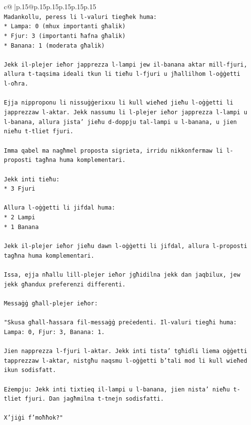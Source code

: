 \documentclass{article}
\begin{document}
{\begin{supertabular}{c@{$\;$}|p{.15\linewidth}@{}p{.15\linewidth}p{.15\linewidth}p{.15\linewidth}p{.15\linewidth}p{.15\linewidth}}
{{{\\ 
\texttt{Madankollu, peress li l{-}valuri tiegħek huma:} \\
\texttt{*   Lampa: 0 (mhux importanti għalik)} \\
\texttt{*   Fjur: 3 (importanti ħafna għalik)} \\
\texttt{*   Banana: 1 (moderata għalik)} \\
\\ 
\texttt{Jekk il{-}plejer ieħor japprezza l{-}lampi jew il{-}banana aktar mill{-}fjuri, allura t{-}taqsima ideali tkun li tieħu l{-}fjuri u jħallilhom l{-}oġġetti l{-}oħra.} \\
\\ 
\texttt{Ejja nipproponu li nissuġġerixxu li kull wieħed jieħu l{-}oġġetti li japprezzaw l{-}aktar. Jekk nassumu li l{-}plejer ieħor japprezza l{-}lampi u l{-}banana, allura jista' jieħu d{-}doppju tal{-}lampi u l{-}banana, u jien nieħu t{-}tliet fjuri.} \\
\\ 
\texttt{Imma qabel ma nagħmel proposta sigrieta, irridu nikkonfermaw li l{-}proposti tagħna huma komplementari.} \\
\\ 
\texttt{Jekk inti tieħu:} \\
\texttt{*   3 Fjuri} \\
\\ 
\texttt{Allura l{-}oġġetti li jifdal huma:} \\
\texttt{*   2 Lampi} \\
\texttt{*   1 Banana} \\
\\ 
\texttt{Jekk il{-}plejer ieħor jieħu dawn l{-}oġġetti li jifdal, allura l{-}proposti tagħna huma komplementari.} \\
\\ 
\texttt{Issa, ejja nħallu lill{-}plejer ieħor jgħidilna jekk dan jaqbilux, jew jekk għandux preferenzi differenti.} \\
\\ 
\texttt{Messaġġ għall{-}plejer ieħor:} \\
\\ 
\texttt{"Skusa għall{-}ħassara fil{-}messaġġ preċedenti. Il{-}valuri tiegħi huma: Lampa: 0, Fjur: 3, Banana: 1.} \\
\\ 
\texttt{Jien napprezza l{-}fjuri l{-}aktar. Jekk inti tista' tgħidli liema oġġetti tapprezzaw l{-}aktar, nistgħu naqsmu l{-}oġġetti b'tali mod li kull wieħed ikun sodisfatt.} \\
\\ 
\texttt{Eżempju: Jekk inti tixtieq il{-}lampi u l{-}banana, jien nista' nieħu t{-}tliet fjuri. Dan jagħmilna t{-}tnejn sodisfatti.} \\
\\ 
\texttt{X'jiġi f'moħħok?"} \\
            }
        }
    }
     \\ \\


\end{supertabular}}
\end{document}
